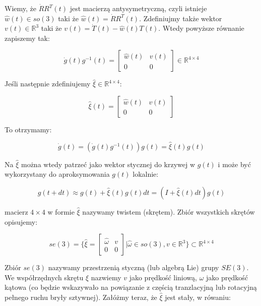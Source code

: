\documentclass[a4paper,12pt]{article}
\newcommand{\RR}{\mathbb{R}^3}
\newcommand{\RRRq}{\mathbb{R}^{4 \times 4}}
\begin{document}
Wiemy, że $\dot{R}R^T(t)$ jest macierzą antysymetryczną, czyli istnieje $\hat{w}(t) \in so(3)$ taki że $\hat{w}(t)=\dot{R}R^T(t)$. Zdefiniujmy także wektor $v(t) \in \RR$ taki że $v(t) = \dot{T}(t) - \hat{w}(t)T(t)$. Wtedy powyższe równanie zapiszemy tak:

\begin{equation}
\dot{g}(t)g^{-1}(t) = \begin{bmatrix} \hat{w}(t) & v(t) \\ 0 & 0 \end{bmatrix} \in \RRRq
\end{equation}

\noindent Jeśli następnie zdefiniujemy $\hat{\xi} \in \RRRq$:

\begin{equation}
\hat{\xi}(t) = \begin{bmatrix} \hat{w}(t) & v(t) \\ 0 & 0 \end{bmatrix}
\end{equation}

\noindent To otrzymamy:

\begin{equation}
\dot{g}(t)=(\dot{g}(t)g^{-1}(t))g(t)=\hat{\xi}(t)g(t)
\end{equation}

Na $\hat{\xi}$ można wtedy patrzeć jako wektor stycznej do krzywej w $g(t)$ i może być wykorzystany do aproksymowania $g(t)$ lokalnie:

\begin{equation}
g(t + dt) \approx g(t) + \hat{\xi}(t)g(t)dt = (I + \hat{\xi}(t)dt)g(t)
\end{equation}

macierz $4 \times 4$ w formie $\hat{\xi}$ nazywamy twistem (skrętem). Zbiór wszystkich skrętów opisujemy:

\begin{equation}
se(3)= \{ \hat{\xi}=\begin{bmatrix} \hat{\omega} & v \\ 0 & 0 \end{bmatrix} | \hat{\omega} \in so(3), v \in \RR \} \subset \RRRq
\end{equation}

Zbiór $se(3)$ nazywamy przestrzenią styczną (lub algebrą Lie) grupy $SE(3)$. We współrzędnych skrętu $\xi$ nazwiemy $v$ jako prędkość liniową, $\omega$ jako prędkość kątowa (co będzie wskazywało na powiązanie z częścią tranzlacyjną lub rotacyjną pełnego ruchu bryły sztywnej). Załóżmy teraz, że $\hat{\xi}$ jest stały, w rówaniu:
\end{document}

